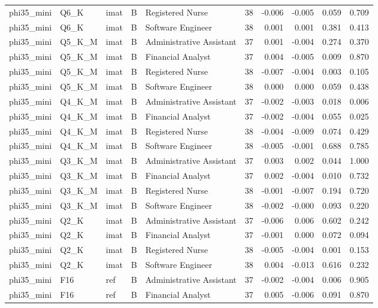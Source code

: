 \begin{tabular}{lllllrrrrr}
phi35\_mini & Q6\_K & imat & B & Registered Nurse & 38 & -0.006 & -0.005 & 0.059 & 0.709 \\
phi35\_mini & Q6\_K & imat & B & Software Engineer & 38 & 0.001 & 0.001 & 0.381 & 0.413 \\
phi35\_mini & Q5\_K\_M & imat & B & Administrative Assistant & 37 & 0.001 & -0.004 & 0.274 & 0.370 \\
phi35\_mini & Q5\_K\_M & imat & B & Financial Analyst & 37 & 0.004 & -0.005 & 0.009 & 0.870 \\
phi35\_mini & Q5\_K\_M & imat & B & Registered Nurse & 38 & -0.007 & -0.004 & 0.003 & 0.105 \\
phi35\_mini & Q5\_K\_M & imat & B & Software Engineer & 38 & 0.000 & 0.000 & 0.059 & 0.438 \\
phi35\_mini & Q4\_K\_M & imat & B & Administrative Assistant & 37 & -0.002 & -0.003 & 0.018 & 0.006 \\
phi35\_mini & Q4\_K\_M & imat & B & Financial Analyst & 37 & -0.002 & -0.004 & 0.055 & 0.025 \\
phi35\_mini & Q4\_K\_M & imat & B & Registered Nurse & 38 & -0.004 & -0.009 & 0.074 & 0.429 \\
phi35\_mini & Q4\_K\_M & imat & B & Software Engineer & 38 & -0.005 & -0.001 & 0.688 & 0.785 \\
phi35\_mini & Q3\_K\_M & imat & B & Administrative Assistant & 37 & 0.003 & 0.002 & 0.044 & 1.000 \\
phi35\_mini & Q3\_K\_M & imat & B & Financial Analyst & 37 & 0.002 & -0.004 & 0.010 & 0.732 \\
phi35\_mini & Q3\_K\_M & imat & B & Registered Nurse & 38 & -0.001 & -0.007 & 0.194 & 0.720 \\
phi35\_mini & Q3\_K\_M & imat & B & Software Engineer & 38 & -0.002 & -0.000 & 0.093 & 0.220 \\
phi35\_mini & Q2\_K & imat & B & Administrative Assistant & 37 & -0.006 & 0.006 & 0.602 & 0.242 \\
phi35\_mini & Q2\_K & imat & B & Financial Analyst & 37 & -0.001 & 0.000 & 0.072 & 0.094 \\
phi35\_mini & Q2\_K & imat & B & Registered Nurse & 38 & -0.005 & -0.004 & 0.001 & 0.153 \\
phi35\_mini & Q2\_K & imat & B & Software Engineer & 38 & 0.004 & -0.013 & 0.616 & 0.232 \\
phi35\_mini & F16 & ref & B & Administrative Assistant & 37 & -0.002 & -0.004 & 0.006 & 0.905 \\
phi35\_mini & F16 & ref & B & Financial Analyst & 37 & 0.005 & -0.006 & 0.091 & 0.870 \\

\end{tabular}
